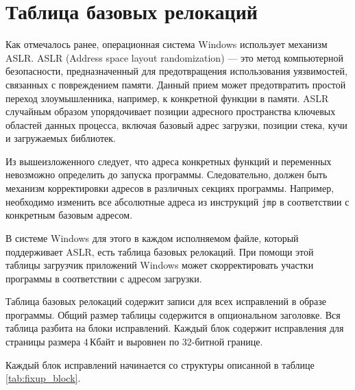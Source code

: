 
\section{Таблица базовых релокаций}

Как отмечалось ранее, операционная система Windows использует механизм ASLR.
ASLR (Address space layout randomization) --- это метод компьютерной
безопасности, предназначенный для предотвращения использования уязвимостей,
связанных с повреждением памяти. Данный прием может предотвратить простой
переход злоумышленника, например, к конкретной функции в памяти. ASLR случайным
образом упорядочивает позиции адресного пространства ключевых областей данных
процесса, включая базовый адрес загрузки, позиции стека, кучи и загружаемых
библиотек.

Из вышеизложенного следует, что адреса конкретных функций и переменных
невозможно определить до запуска программы. Следовательно, должен быть механизм
корректировки адресов в различных секциях программы. Например, необходимо
изменить все абсолютные адреса из инструкций \verb!jmp! в соответствии с
конкретным базовым адресом.

В системе Windows для этого в каждом исполняемом файле, который поддерживает
ASLR, есть таблица базовых релокаций. При помощи этой таблицы загрузчик
приложений Windows может скорректировать участки программы в соответствии с
адресом загрузки.

Таблица базовых релокаций содержит записи для всех исправлений в образе
программы. Общий размер таблицы содержится в опциональном заголовке. Вся таблица
разбита на блоки исправлений. Каждый блок содержит исправления для страницы
размера 4\,Кбайт и выровнен по 32-битной границе. 

Каждый блок исправлений начинается со структуры описанной в таблице
\ref{tab:fixup_block}.


